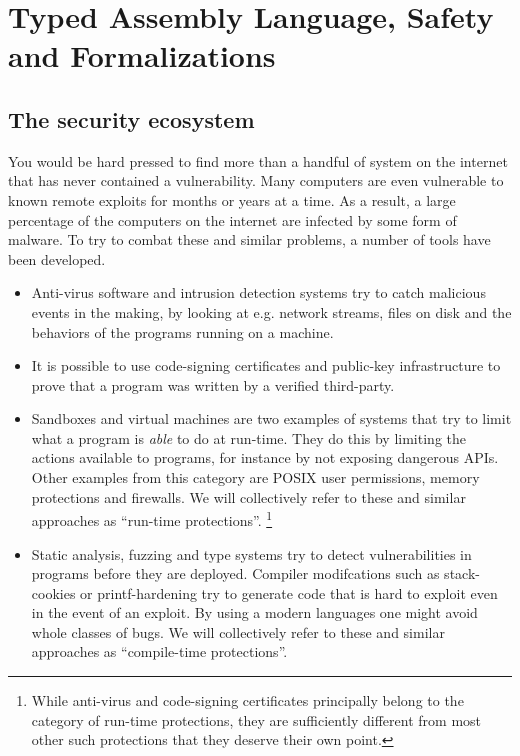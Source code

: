 \chapter{Typed Assembly Language, Safety and Formalizations}
\label{chap:introduction}

\section{The security ecosystem}
You would be hard pressed to find more than a handful of system on the internet
that has never contained a vulnerability. Many computers are even vulnerable to
known remote exploits for months or years at a time. As a result, a large
percentage of the computers on the internet are infected by some form of
malware. To try to combat these and similar problems, a number of tools have
been developed.

\begin{itemize}
\item Anti-virus software and intrusion detection systems try to catch malicious
  events in the making, by looking at e.g. network streams, files on disk and
  the behaviors of the programs running on a machine.
\item It is possible to use code-signing certificates and public-key
  infrastructure to prove that a program was written by a verified third-party.
\item Sandboxes and virtual machines are two examples of systems that try to
  limit what a program is \emph{able} to do at run-time. They do this by
  limiting the actions available to programs, for instance by not exposing
  dangerous APIs. Other examples from this category are POSIX user permissions,
  memory protections and firewalls. We will collectively refer to these and
  similar approaches as ``run-time protections''.  \footnote{While anti-virus
    and code-signing certificates principally belong to the category of run-time
    protections, they are sufficiently different from most other such
    protections that they deserve their own point.  }
\item Static analysis, fuzzing and type systems try to detect vulnerabilities in
  programs before they are deployed. Compiler modifcations such as stack-cookies
  or printf-hardening try to generate code that is hard to exploit even in the
  event of an exploit. By using a modern languages one might avoid whole classes
  of bugs. We will collectively refer to these and similar approaches as
  ``compile-time protections''.
\end{itemize}

